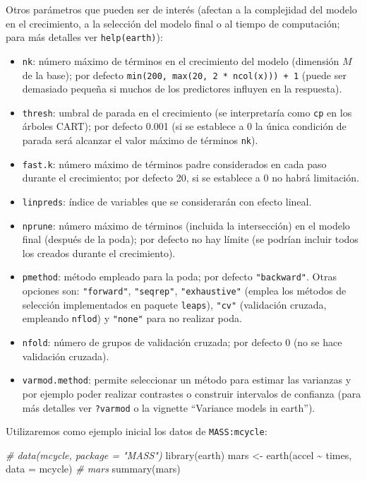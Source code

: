 \documentclass[
  spanish,
]{book}
\newenvironment{Shaded}{\begin{snugshade}}{\end{snugshade}}
\newcommand{\AttributeTok}[1]{\textcolor[rgb]{0.77,0.63,0.00}{#1}}
\newcommand{\CommentTok}[1]{\textcolor[rgb]{0.56,0.35,0.01}{\textit{#1}}}
\newcommand{\FunctionTok}[1]{\textcolor[rgb]{0.00,0.00,0.00}{#1}}
\newcommand{\NormalTok}[1]{#1}
\newcommand{\OtherTok}[1]{\textcolor[rgb]{0.56,0.35,0.01}{#1}}
\newcommand{\SpecialCharTok}[1]{\textcolor[rgb]{0.00,0.00,0.00}{#1}}
\theoremstyle{break}
\theoremstyle{definition}
\theoremstyle{definition}
\theoremstyle{definition}
\theoremstyle{definition}
\theoremstyle{remark}
\begin{document}
Otros parámetros que pueden ser de interés (afectan a la complejidad del modelo en el crecimiento, a la selección del modelo final o al tiempo de computación; para más detalles ver \texttt{help(earth)}):

\begin{itemize}
\item
  \texttt{nk}: número máximo de términos en el crecimiento del modelo (dimensión \(M\) de la base); por defecto \texttt{min(200,\ max(20,\ 2\ *\ ncol(x)))\ +\ 1} (puede ser demasiado pequeña si muchos de los predictores influyen en la respuesta).
\item
  \texttt{thresh}: umbral de parada en el crecimiento (se interpretaría como \texttt{cp} en los árboles CART); por defecto 0.001 (si se establece a 0 la única condición de parada será alcanzar el valor máximo de términos \texttt{nk}).
\item
  \texttt{fast.k}: número máximo de términos padre considerados en cada paso durante el crecimiento; por defecto 20, si se establece a 0 no habrá limitación.
\item
  \texttt{linpreds}: índice de variables que se considerarán con efecto lineal.
\item
  \texttt{nprune}: número máximo de términos (incluida la intersección) en el modelo final (después de la poda); por defecto no hay límite (se podrían incluir todos los creados durante el crecimiento).
\item
  \texttt{pmethod}: método empleado para la poda; por defecto \texttt{"backward"}. Otras opciones son: \texttt{"forward"}, \texttt{"seqrep"}, \texttt{"exhaustive"} (emplea los métodos de selección implementados en paquete \texttt{leaps}), \texttt{"cv"} (validación cruzada, empleando \texttt{nflod}) y \texttt{"none"} para no realizar poda.
\item
  \texttt{nfold}: número de grupos de validación cruzada; por defecto 0 (no se hace validación cruzada).
\item
  \texttt{varmod.method}: permite seleccionar un método para estimar las varianzas y por ejemplo poder realizar contrastes o construir intervalos de confianza (para más detalles ver \texttt{?varmod} o la vignette ``Variance models in earth'').
\end{itemize}

Utilizaremos como ejemplo inicial los datos de \texttt{MASS:mcycle}:

\begin{Shaded}
\begin{Highlighting}[]
\CommentTok{\# data(mcycle, package = "MASS")}
\FunctionTok{library}\NormalTok{(earth)}
\NormalTok{mars }\OtherTok{\textless{}{-}} \FunctionTok{earth}\NormalTok{(accel }\SpecialCharTok{\textasciitilde{}}\NormalTok{ times, }\AttributeTok{data =}\NormalTok{ mcycle)}
\CommentTok{\# mars}
\FunctionTok{summary}\NormalTok{(mars)}
\end{Highlighting}
\end{Shaded}
\end{document}
